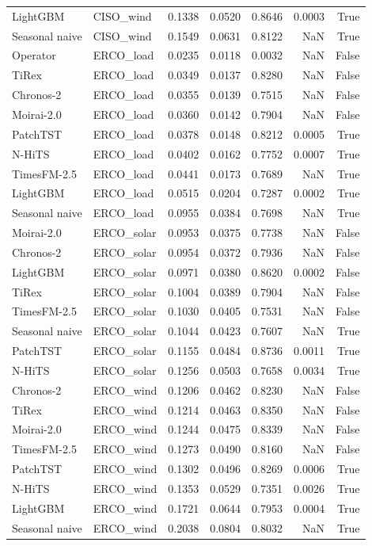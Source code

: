 \begin{tabular}{llrrrrr}
LightGBM & CISO_wind & 0.1338 & 0.0520 & 0.8646 & 0.0003 & True \\
Seasonal naive & CISO_wind & 0.1549 & 0.0631 & 0.8122 & NaN & True \\
Operator & ERCO_load & 0.0235 & 0.0118 & 0.0032 & NaN & False \\
TiRex & ERCO_load & 0.0349 & 0.0137 & 0.8280 & NaN & False \\
Chronos-2 & ERCO_load & 0.0355 & 0.0139 & 0.7515 & NaN & False \\
Moirai-2.0 & ERCO_load & 0.0360 & 0.0142 & 0.7904 & NaN & False \\
PatchTST & ERCO_load & 0.0378 & 0.0148 & 0.8212 & 0.0005 & True \\
N-HiTS & ERCO_load & 0.0402 & 0.0162 & 0.7752 & 0.0007 & True \\
TimesFM-2.5 & ERCO_load & 0.0441 & 0.0173 & 0.7689 & NaN & True \\
LightGBM & ERCO_load & 0.0515 & 0.0204 & 0.7287 & 0.0002 & True \\
Seasonal naive & ERCO_load & 0.0955 & 0.0384 & 0.7698 & NaN & True \\
Moirai-2.0 & ERCO_solar & 0.0953 & 0.0375 & 0.7738 & NaN & False \\
Chronos-2 & ERCO_solar & 0.0954 & 0.0372 & 0.7936 & NaN & False \\
LightGBM & ERCO_solar & 0.0971 & 0.0380 & 0.8620 & 0.0002 & False \\
TiRex & ERCO_solar & 0.1004 & 0.0389 & 0.7904 & NaN & False \\
TimesFM-2.5 & ERCO_solar & 0.1030 & 0.0405 & 0.7531 & NaN & False \\
Seasonal naive & ERCO_solar & 0.1044 & 0.0423 & 0.7607 & NaN & True \\
PatchTST & ERCO_solar & 0.1155 & 0.0484 & 0.8736 & 0.0011 & True \\
N-HiTS & ERCO_solar & 0.1256 & 0.0503 & 0.7658 & 0.0034 & True \\
Chronos-2 & ERCO_wind & 0.1206 & 0.0462 & 0.8230 & NaN & False \\
TiRex & ERCO_wind & 0.1214 & 0.0463 & 0.8350 & NaN & False \\
Moirai-2.0 & ERCO_wind & 0.1244 & 0.0475 & 0.8339 & NaN & False \\
TimesFM-2.5 & ERCO_wind & 0.1273 & 0.0490 & 0.8160 & NaN & False \\
PatchTST & ERCO_wind & 0.1302 & 0.0496 & 0.8269 & 0.0006 & True \\
N-HiTS & ERCO_wind & 0.1353 & 0.0529 & 0.7351 & 0.0026 & True \\
LightGBM & ERCO_wind & 0.1721 & 0.0644 & 0.7953 & 0.0004 & True \\
Seasonal naive & ERCO_wind & 0.2038 & 0.0804 & 0.8032 & NaN & True \\
\bottomrule
\end{tabular}

